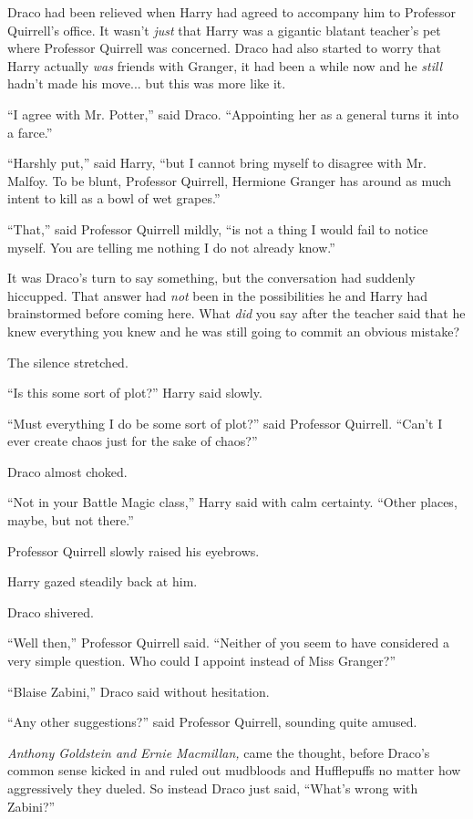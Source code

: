 Draco had been relieved when Harry had agreed to accompany him to Professor Quirrell's office. It wasn't \emph{just} that Harry was a gigantic blatant teacher's pet where Professor Quirrell was concerned. Draco had also started to worry that Harry actually \emph{was} friends with Granger, it had been a while now and he \emph{still} hadn't made his move... but this was more like it.

``I agree with Mr. Potter,'' said Draco. ``Appointing her as a general turns it into a farce.''

``Harshly put,'' said Harry, ``but I cannot bring myself to disagree with Mr. Malfoy. To be blunt, Professor Quirrell, Hermione Granger has around as much intent to kill as a bowl of wet grapes.''

``That,'' said Professor Quirrell mildly, ``is not a thing I would fail to notice myself. You are telling me nothing I do not already know.''

It was Draco's turn to say something, but the conversation had suddenly hiccupped. That answer had \emph{not} been in the possibilities he and Harry had brainstormed before coming here. What \emph{did} you say after the teacher said that he knew everything you knew and he was still going to commit an obvious mistake?

The silence stretched.

``Is this some sort of plot?'' Harry said slowly.

``Must everything I do be some sort of plot?'' said Professor Quirrell. ``Can't I ever create chaos just for the sake of chaos?''

Draco almost choked.

``Not in your Battle Magic class,'' Harry said with calm certainty. ``Other places, maybe, but not there.''

Professor Quirrell slowly raised his eyebrows.

Harry gazed steadily back at him.

Draco shivered.

``Well then,'' Professor Quirrell said. ``Neither of you seem to have considered a very simple question. Who could I appoint instead of Miss Granger?''

``Blaise Zabini,'' Draco said without hesitation.

``Any other suggestions?'' said Professor Quirrell, sounding quite amused.

\emph{Anthony Goldstein and Ernie Macmillan,} came the thought, before Draco's common sense kicked in and ruled out mudbloods and Hufflepuffs no matter how aggressively they dueled. So instead Draco just said, ``What's wrong with Zabini?''

